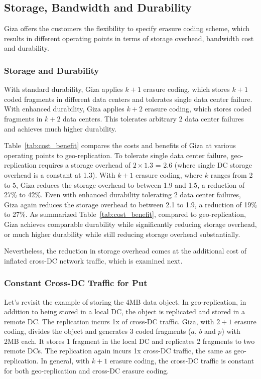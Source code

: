 \subsection{Storage, Bandwidth and Durability}

Giza offers the customers the flexibility to specify erasure coding scheme, which results in different operating points in terms of storage overhead, bandwidth cost and durability.

\subsubsection{Storage and Durability}

With standard durability, Giza applies $k+1$ erasure coding, which stores $k+1$ coded fragments in different data centers and tolerates single data center failure. With enhanced durability, Giza applies $k+2$ erasure coding, which stores coded fragments in $k+2$ data centers. This tolerates arbitrary 2 data center failures and achieves much higher durability. 

Table~\ref{tab:cost_benefit} compares the costs and benefits of Giza at various operating points to geo-replication.
To tolerate single data center failure, geo-replication requires a storage overhead of $2\times1.3$ = 2.6 (where single DC storage overhead is a constant at 1.3). With $k+1$ erasure coding, where $k$ ranges from 2 to 5, Giza reduces the storage overhead to between 1.9 and 1.5, a reduction of 27\% to 42\%. Even with enhanced durability tolerating 2 data center failures, Giza again reduces the storage overhead to between 2.1 to 1.9, a reduction of 19\% to 27\%. As summarized Table~\ref{tab:cost_benefit}, compared to geo-replication, Giza achieves comparable durability while significantly reducing storage overhead, or much higher durability while still reducing storage overhead substantially.

Nevertheless, the reduction in storage overhead comes at the additional cost of inflated cross-DC network traffic, which is examined next.

\subsubsection{Constant Cross-DC Traffic for Put}

Let's revisit the example of storing the 4MB data object. In geo-replication, in addition to being stored in a local DC, the object is replicated and stored in a remote DC. The replication incurs 1x of cross-DC traffic. Giza, with $2 + 1$ erasure coding, divides the object  and generates 3 coded fragments ($a$, $b$ and $p$) with 2MB each. It stores 1 fragment in the local DC and replicates 2 fragments to two remote DCs. The replication again incurs 1x cross-DC traffic, the same as geo-replication. In general, with $k+1$ erasure coding, the cross-DC traffic is constant for both geo-replication and cross-DC erasure coding.

